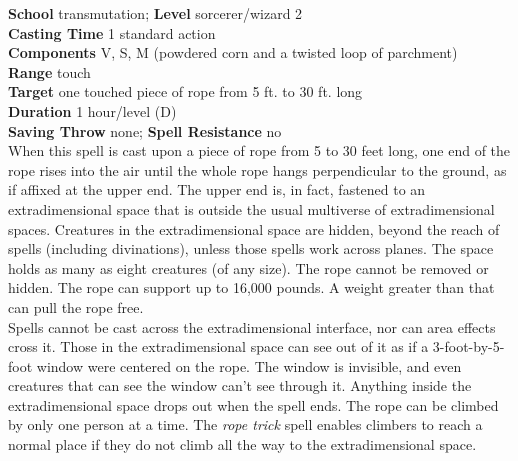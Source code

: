 \textbf{School} transmutation; \textbf{Level} sorcerer/wizard 2\\
\textbf{Casting Time} 1 standard action\\
\textbf{Components} V, S, M (powdered corn and a twisted loop of parchment)\\
\textbf{Range} touch\\
\textbf{Target} one touched piece of rope from 5 ft. to 30 ft. long\\
\textbf{Duration} 1 hour/level (D)\\
\textbf{Saving Throw} none; \textbf{Spell Resistance} no\\
When this spell is cast upon a piece of rope from 5 to 30 feet long, one end of the rope rises into the air until the whole rope hangs perpendicular to the ground, as if affixed at the upper end. The upper end is, in fact, fastened to an extradimensional space that is outside the usual multiverse of extradimensional spaces. Creatures in the extradimensional space are hidden, beyond the reach of spells (including divinations), unless those spells work across planes. The space holds as many as eight creatures (of any size). The rope cannot be removed or hidden. The rope can support up to 16,000 pounds. A weight greater than that can pull the rope free.\\
Spells cannot be cast across the extradimensional interface, nor can area effects cross it. Those in the extradimensional space can see out of it as if a 3-foot-by-5-foot window were centered on the rope. The window is invisible, and even creatures that can see the window can't see through it. Anything inside the extradimensional space drops out when the spell ends. The rope can be climbed by only one person at a time. The \textit{rope trick }spell enables climbers to reach a normal place if they do not climb all the way to the extradimensional space.\\
